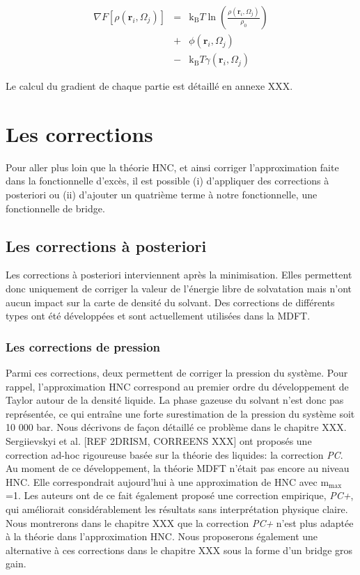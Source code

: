 \begin{eqnarray}
\nabla F[\rho(\boldsymbol{r}_i,\Omega_j)] &=& \mathrm{k_B}T \ln(\frac{\rho(\boldsymbol{r}_i,\Omega_j)}{\rho_0}) \\
&+& \phi(\boldsymbol{r}_i,\Omega_j ) \nonumber \\
&-& \mathrm{k_B}T \gamma(\boldsymbol{r}_i,\Omega_j) \nonumber
\end{eqnarray}

Le calcul du gradient de chaque partie est détaillé en annexe XXX.

\section{Les corrections}
Pour aller plus loin que la théorie HNC, et ainsi corriger l'approximation faite dans la fonctionnelle d'excès, il est possible (i) d'appliquer des corrections à posteriori ou (ii) d'ajouter un quatrième terme à notre fonctionnelle, une fonctionnelle de bridge.


\subsection{Les corrections à posteriori}
Les corrections à posteriori interviennent après la minimisation. Elles permettent donc uniquement de corriger la valeur de l'énergie libre de solvatation mais n'ont aucun impact sur la carte de densité du solvant. Des corrections de différents types ont été développées et sont actuellement utilisées dans la MDFT.


\subsubsection{Les corrections de pression}
Parmi ces corrections, deux permettent de corriger la pression du système. Pour rappel, l'approximation HNC correspond au premier ordre du développement de Taylor autour de la densité liquide. La phase gazeuse du solvant n'est donc pas représentée, ce qui entraîne une forte surestimation de la pression du système soit 10 000 bar. Nous décrivons de façon détaillé ce problème dans le chapitre XXX. Sergiievskyi et al. \cite{sergiievskyi_solvation_2015,sergiievskyi_pressure_2015} [REF 2DRISM, CORREENS XXX] ont proposés une correction ad-hoc rigoureuse basée sur la théorie des liquides: la correction \textit{PC}. Au moment de ce développement, la théorie MDFT n'était pas encore au niveau HNC. Elle correspondrait aujourd'hui à une approximation de HNC avec $\mathrm{m}_\mathrm{max}$=1. Les auteurs ont de ce fait également proposé une correction empirique, \textit{PC+}, qui améliorait considérablement les résultats sans interprétation physique claire. Nous montrerons dans le chapitre XXX que la correction \textit{PC+} n'est plus adaptée à la théorie dans l'approximation HNC. Nous proposerons également une alternative à ces corrections dans le chapitre XXX sous la forme d'un bridge gros gain.


